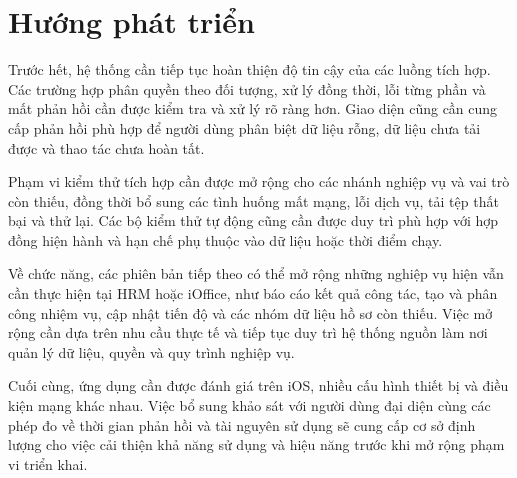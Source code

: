 \section{Hướng phát triển}
\label{sec:huongphattrien}

Trước hết, hệ thống cần tiếp tục hoàn thiện độ tin cậy của các luồng tích hợp. Các trường hợp phân quyền theo đối tượng, xử lý đồng thời, lỗi từng phần và mất phản hồi cần được kiểm tra và xử lý rõ ràng hơn. Giao diện cũng cần cung cấp phản hồi phù hợp để người dùng phân biệt dữ liệu rỗng, dữ liệu chưa tải được và thao tác chưa hoàn tất.

Phạm vi kiểm thử tích hợp cần được mở rộng cho các nhánh nghiệp vụ và vai trò còn thiếu, đồng thời bổ sung các tình huống mất mạng, lỗi dịch vụ, tải tệp thất bại và thử lại. Các bộ kiểm thử tự động cũng cần được duy trì phù hợp với hợp đồng hiện hành và hạn chế phụ thuộc vào dữ liệu hoặc thời điểm chạy.

Về chức năng, các phiên bản tiếp theo có thể mở rộng những nghiệp vụ hiện vẫn cần thực hiện tại HRM hoặc iOffice, như báo cáo kết quả công tác, tạo và phân công nhiệm vụ, cập nhật tiến độ và các nhóm dữ liệu hồ sơ còn thiếu. Việc mở rộng cần dựa trên nhu cầu thực tế và tiếp tục duy trì hệ thống nguồn làm nơi quản lý dữ liệu, quyền và quy trình nghiệp vụ.

Cuối cùng, ứng dụng cần được đánh giá trên iOS, nhiều cấu hình thiết bị và điều kiện mạng khác nhau. Việc bổ sung khảo sát với người dùng đại diện cùng các phép đo về thời gian phản hồi và tài nguyên sử dụng sẽ cung cấp cơ sở định lượng cho việc cải thiện khả năng sử dụng và hiệu năng trước khi mở rộng phạm vi triển khai.
